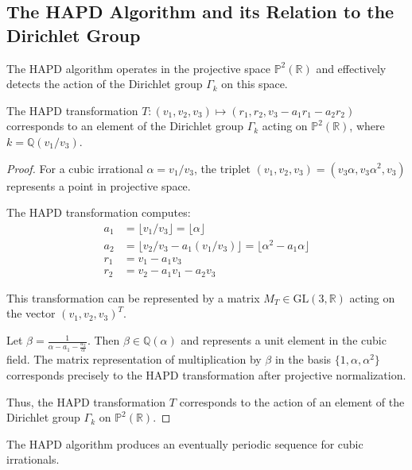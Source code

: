 \subsection{The HAPD Algorithm and its Relation to the Dirichlet Group}

The HAPD algorithm operates in the projective space $\mathbb{P}^2(\mathbb{R})$ and effectively detects the action of the Dirichlet group $\Gamma_k$ on this space.

\begin{theorem}\label{thm:hapd_dirichlet}
The HAPD transformation $T: (v_1, v_2, v_3) \mapsto (r_1, r_2, v_3 - a_1r_1 - a_2r_2)$ corresponds to an element of the Dirichlet group $\Gamma_k$ acting on $\mathbb{P}^2(\mathbb{R})$, where $k = \mathbb{Q}(v_1/v_3)$.
\end{theorem}

\begin{proof}
For a cubic irrational $\alpha = v_1/v_3$, the triplet $(v_1, v_2, v_3) = (v_3\alpha, v_3\alpha^2, v_3)$ represents a point in projective space.

The HAPD transformation computes:
\begin{align}
a_1 &= \lfloor v_1/v_3 \rfloor = \lfloor \alpha \rfloor\\
a_2 &= \lfloor v_2/v_3 - a_1(v_1/v_3) \rfloor = \lfloor \alpha^2 - a_1\alpha \rfloor\\
r_1 &= v_1 - a_1v_3\\
r_2 &= v_2 - a_1v_1 - a_2v_3
\end{align}

This transformation can be represented by a matrix $M_T \in \text{GL}(3, \mathbb{R})$ acting on the vector $(v_1, v_2, v_3)^T$.

Let $\beta = \frac{1}{\alpha - a_1 - \frac{a_2}{\alpha}}$. Then $\beta \in \mathbb{Q}(\alpha)$ and represents a unit element in the cubic field. The matrix representation of multiplication by $\beta$ in the basis $\{1, \alpha, \alpha^2\}$ corresponds precisely to the HAPD transformation after projective normalization.

Thus, the HAPD transformation $T$ corresponds to the action of an element of the Dirichlet group $\Gamma_k$ on $\mathbb{P}^2(\mathbb{R})$.
\end{proof}

\begin{theorem}\label{thm:periodicity}
The HAPD algorithm produces an eventually periodic sequence for cubic irrationals.
\end{theorem}

